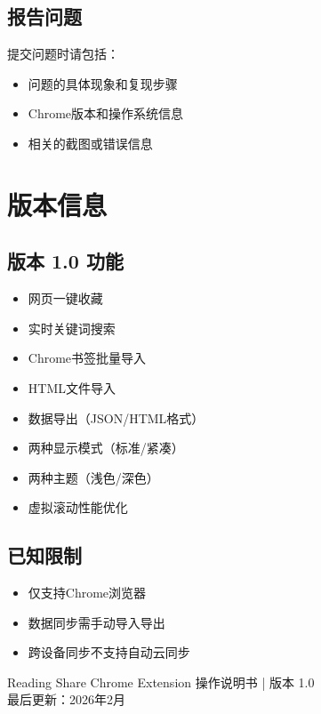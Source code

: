 \documentclass[10pt,a4paper]{article}
\begin{document}
\subsection{报告问题}
提交问题时请包括：
\begin{itemize}
  \item 问题的具体现象和复现步骤
  \item Chrome版本和操作系统信息
  \item 相关的截图或错误信息
\end{itemize}

\vspace{5pt}

\section{版本信息}

\subsection{版本 1.0 功能}
\begin{itemize}
  \item 网页一键收藏
  \item 实时关键词搜索
  \item Chrome书签批量导入
  \item HTML文件导入
  \item 数据导出（JSON/HTML格式）
  \item 两种显示模式（标准/紧凑）
  \item 两种主题（浅色/深色）
  \item 虚拟滚动性能优化
\end{itemize}

\subsection{已知限制}
\begin{itemize}
  \item 仅支持Chrome浏览器
  \item 数据同步需手动导入导出
  \item 跨设备同步不支持自动云同步
\end{itemize}

\vspace{10pt}

\begin{center}
\small
Reading Share Chrome Extension 操作说明书 | 版本 1.0\\
最后更新：2026年2月
\end{center}
\end{document}
